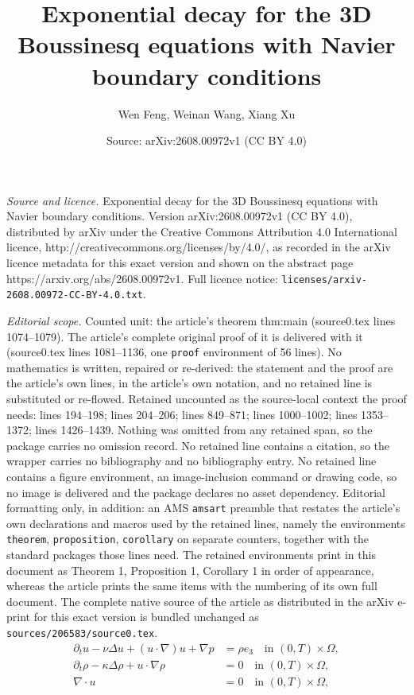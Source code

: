 \documentclass[10pt,a4paper]{amsart}
\title{Exponential decay for the 3D Boussinesq equations with Navier boundary conditions}
\author{Wen Feng, Weinan Wang, Xiang Xu}
\date{Source: arXiv:2608.00972v1 (CC BY 4.0)}
\begin{document}
\maketitle

\noindent\emph{Source and licence.} Exponential decay for the 3D Boussinesq equations with Navier boundary conditions. Version arXiv:2608.00972v1 (CC BY 4.0), distributed by arXiv under the Creative Commons Attribution 4.0 International licence, http://creativecommons.org/licenses/by/4.0/, as recorded in the arXiv licence metadata for this exact version and shown on the abstract page https://arxiv.org/abs/2608.00972v1. Full licence notice: \texttt{licenses/arxiv-2608.00972-CC-BY-4.0.txt}.\par\smallskip

\noindent\textit{Editorial scope.} Counted unit: the article's theorem thm:main (source0.tex lines 1074--1079). The article's complete original proof of it is delivered with it (source0.tex lines 1081--1136, one \texttt{proof} environment of 56 lines). No mathematics is written, repaired or re-derived: the statement and the proof are the article's own lines, in the article's own notation, and no retained line is substituted or re-flowed.  Retained uncounted as the source-local context the proof needs: lines 194--198; lines 204--206; lines 849--871; lines 1000--1002; lines 1353--1372; lines 1426--1439.  Nothing was omitted from any retained span, so the package carries no omission record.  No retained line contains a citation, so the wrapper carries no bibliography and no bibliography entry.  No retained line contains a figure environment, an image-inclusion command or drawing code, so no image is delivered and the package declares no asset dependency.  Editorial formatting only, in addition: an AMS \texttt{amsart} preamble that restates the article's own declarations and macros used by the retained lines, namely the environments \texttt{theorem}, \texttt{proposition}, \texttt{corollary} on separate counters, together with the standard packages those lines need.  The retained environments print in this document as Theorem 1, Proposition 1, Corollary 1 in order of appearance, whereas the article prints the same items with the numbering of its own full document.  The complete native source of the article as distributed in the arXiv e-print for this exact version is bundled unchanged as \texttt{sources/206583/source0.tex}.
\begin{align}
    \partial_t {u} - \nu \Delta {u} + ({u} \cdot \nabla) {u} + \nabla p &= \rho {e}_3 \quad \text{in } (0, T) \times \Omega, \label{eq:bouss_momentum} \\
    \partial_t \rho - \kappa \Delta \rho + {u} \cdot \nabla \rho &= 0 \quad \text{in } (0, T) \times \Omega, \label{eq:bouss_density} \\
    \nabla \cdot {u} &= 0 \quad \text{in } (0, T) \times \Omega, \label{eq:bouss_div}
\end{align}
\end{document}
